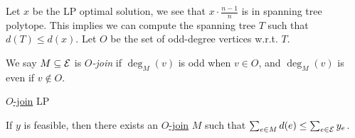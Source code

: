 Let \(x\) be the LP optimal solution, we see that \(x\cdot \frac{n-1}{n}\) is in spanning tree polytope. This implies we can compute the spanning tree \(T\) such that \(d(T) \leq d(x)\). Let \(O\) be the set of odd-degree vertices w.r.t. \(T\).

\begin{notation}[\(O\)-join]\label{def:O-join}
	We say \(M \subseteq \mathcal{\MakeUppercase{e}} \) is \emph{\(O\)-join} if \(\deg_M(v)\) is odd when \(v\in O\), and \(\deg_M(v)\) is even if \(v \notin O\).
\end{notation}

\hyperref[def:O-join]{\(O\)-join} LP

\begin{theorem}
	If \(y\) is feasible, then there exists an \hyperref[def:O-join]{\(O\)-join} \(M\) such that \(\sum_{e\in M}d(e) \leq \sum_{e\in \mathcal{\MakeUppercase{e}} }y_e\).
\end{theorem}

\begin{corollary}

\end{corollary}
